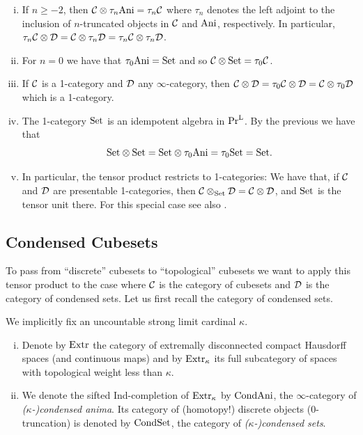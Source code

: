 \begin{example}\label{ex:pres-tens-prod}
\begin{enumerate}[(i)]
    \item If $n\geq -2$, then $\mathcal{C}\otimes\tau_n\mathrm{Ani} = \tau_n\mathcal{C}$
        where $\tau_n$ denotes the left adjoint to the inclusion of $n$-truncated objects in $\mathcal{C}$ and $\mathrm{Ani}$, respectively.
        In particular, $\tau_n\mathcal{C}\otimes\mathcal{D} = \mathcal{C}\otimes\tau_n\mathcal{D} = \tau_n\mathcal{C}\otimes\tau_n\mathcal{D}$.
    \item For $n = 0$ we have that $\tau_0\mathrm{Ani} = \mathrm{Set}$ and so $\mathcal{C}\otimes\mathrm{Set} = \tau_0\mathcal{C}$.
    \item If $\mathcal{C}$ is a 1-category and $\mathcal{D}$ any $\infty$-category, then
        $\mathcal{C}\otimes\mathcal{D} = \tau_0\mathcal{C}\otimes\mathcal{D} = \mathcal{C}\otimes\tau_0\mathcal{D}$ which is a 1-category.
    \item The 1-category $\mathrm{Set}$ is an idempotent algebra in $\mathrm{Pr}^\mathrm{L}$.
        By the previous we have that
        \[
            \mathrm{Set}\otimes\mathrm{Set} = \mathrm{Set}\otimes\tau_0\mathrm{Ani} = \tau_0\mathrm{Set} = \mathrm{Set}.
        \]
    \item In particular, the tensor product restricts to 1-categories:
        We have that, if $\mathcal{C}$ and $\mathcal{D}$ are presentable 1-categories, then $\mathcal{C}\otimes_{\mathrm{Set}}\mathcal{D} = \mathcal{C}\otimes\mathcal{D}$,
        and $\mathrm{Set}$ is the tensor unit there.
        For this special case see also \cite{Bird1984}.
\end{enumerate}
\end{example}


\subsection{Condensed Cubesets}

To pass from \enquote{discrete} cubesets to \enquote{topological} cubesets we want to apply this tensor product
to the case where $\mathcal{C}$ is the category of cubesets and $\mathcal{D}$ is the category of condensed sets.
Let us first recall the category of condensed sets.

We implicitly fix an uncountable strong limit cardinal $\kappa$.

\begin{definition}\label{def:cond}
\begin{enumerate}[(i)]
    \item Denote by $\mathrm{Extr}$ the category of extremally disconnected compact Hausdorff spaces (and continuous maps)
            and by $\mathrm{Extr}_\kappa$ its full subcategory of spaces with topological weight less than $\kappa$.
    \item We denote the sifted Ind-completion of $\mathrm{Extr}_\kappa$ by $\mathrm{CondAni}$, the $\infty$-category of \emph{($\kappa$-)condensed anima}.
            Its category of (homotopy!) discrete objects (0-truncation) is denoted by $\mathrm{CondSet}$,
            the category of \emph{($\kappa$-)condensed sets}.
\end{enumerate}
\end{definition}

